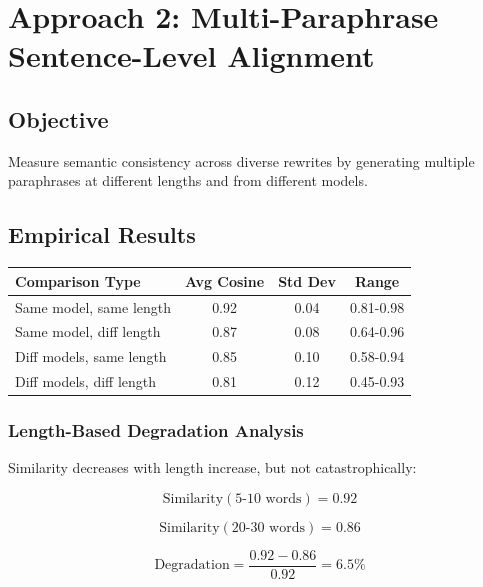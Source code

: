 \documentclass[12pt,a4paper,oneside]{report}
\begin{document}
\section{Approach 2: Multi-Paraphrase Sentence-Level Alignment}

\subsection{Objective}

Measure semantic consistency across diverse rewrites by generating multiple paraphrases at different lengths and from different models.

\subsection{Empirical Results}

\begin{table}[H]
\centering
\begin{tabular}{|l|c|c|c|}
\hline
\textbf{Comparison Type} & \textbf{Avg Cosine} & \textbf{Std Dev} & \textbf{Range} \\
\hline
Same model, same length & 0.92 & 0.04 & 0.81-0.98 \\
\hline
Same model, diff length & 0.87 & 0.08 & 0.64-0.96 \\
\hline
Diff models, same length & 0.85 & 0.10 & 0.58-0.94 \\
\hline
Diff models, diff length & 0.81 & 0.12 & 0.45-0.93 \\
\hline
\end{tabular}
\end{table}

\subsubsection{Length-Based Degradation Analysis}

Similarity decreases with length increase, but not catastrophically:

\begin{equation}
\text{Similarity}(\text{5-10 words}) = 0.92
\end{equation}

\begin{equation}
\text{Similarity}(\text{20-30 words}) = 0.86
\end{equation}

\begin{equation}
\text{Degradation} = \frac{0.92 - 0.86}{0.92} = 6.5\%
\end{equation}
\end{document}
